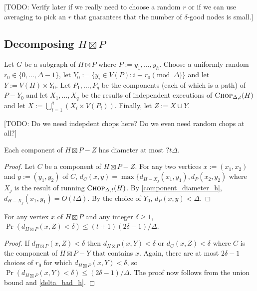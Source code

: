 \documentclass{patmorin}
\begin{document}
[TODO: Verify later if we really need to choose a random $r$ or if we can use averaging to pick an $r$ that guarantees that the number of $\delta$-good nodes is small.]

\subsection{\boldmath Decomposing $H\boxtimes P$}

Let $G$ be a subgraph of $H\boxtimes P$ where $P:=y_1,\ldots,y_h$. Choose a uniformly random $r_0\in\{0,\ldots,\Delta-1\}$, let $Y_0:=\{y_i\in V(P):i\equiv r_0\pmod\Delta\}$ and let $Y:=V(H)\times Y_0$.  Let $P_1,\ldots,P_q$ be the components (each of which is a path) of $P-Y_0$ and let $X_1,\ldots,X_q$ be the results of independent executions of $\textsc{Chop}_{\Delta,t}(H)$ and let $X:=\bigcup_{i=1}^q (X_i\times V(P_i))$.  Finally, let $Z:=X\cup Y$.

[TODO: Do we need indepdent chops here?  Do we even need random chops at all?]

\begin{lem}
  Each component of $H\boxtimes P-Z$ has diameter at most $?t\Delta$.
\end{lem}

\begin{proof}
  Let $C$ be a component of $H\boxtimes P-Z$.  For any two vertices $x:=(x_1,x_2)$ and $y:=(y_1,y_2)$ of $C$, $d_{C}(x,y) = \max\{d_{H-X_j}(x_1,y_1),d_{P}(x_2,y_2)$ where $X_j$ is the result of running $\textsc{Chop}_{\Delta,t}(H)$. By \cref{component_diameter_h},  $d_{H-X_j}(x_1,y_1)=O(t\Delta)$.  By the choice of $Y_0$, $d_{P}(x,y)<\Delta$.
\end{proof}



\begin{lem}\label{delta_bad_product}
  For any vertex $x$ of $H\boxtimes P$ and any integer $\delta\ge 1$, $\Pr(d_{H\boxtimes P}(x,Z)< \delta)\le (t+1)(2\delta-1)/\Delta$.
\end{lem}

\begin{proof}
  If $d_{H\boxtimes P}(x,Z)<\delta$ then $d_{H\boxtimes P}(x,Y)<\delta$ or $d_{C}(x,Z)<\delta$ where $C$ is the component of $H\boxtimes P-Y$ that contains $x$.  Again, there are at most $2\delta-1$ choices of $r_0$ for which $d_{H\boxtimes P}(x,Y)<\delta$, so $\Pr(d_{H\boxtimes P}(x,Y)<\delta)\le (2\delta-1)/\Delta$.  The proof now follows from the union bound and \cref{delta_bad_h}.
\end{proof}
\end{document}
